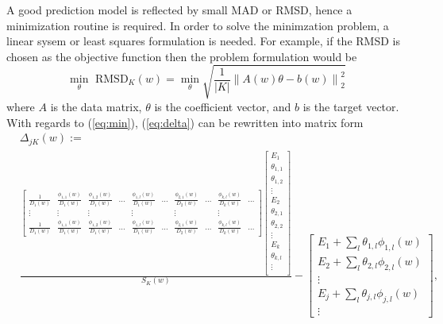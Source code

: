 \documentclass[12pt]{article}
\begin{document}
A good prediction model is reflected by small MAD or RMSD, hence a minimization routine is required. In order to solve the minimzation problem, a linear sysem or least squares formulation is needed. For example, if the RMSD is chosen as the objective function then the problem formulation would be
\begin{equation}
    \label{eq:min}
    \min_{\theta} \text{ RMSD}_K(w) = \min_{\theta} \sqrt{\frac{1}{|K|} \left\| A(w)\theta - b(w)\right\|_2^2}
\end{equation}
where $A$ is the data matrix, $\theta$ is the coefficient vector, and $b$ is the target vector.
With regards to (\ref{eq:min}), (\ref{eq:delta}) can be rewritten into matrix form
\begin{equation}
    \label{eq:delta_matrix}
    \begin{split}
        &\Delta_{jK}(w) := \\
        &\frac{
            \begin{bmatrix}
                \frac{1}{D_1(w)} & \frac{\phi_{1, 1}(w)}{D_1(w)} & \frac{\phi_{1,2}(w)}{D_1(w)} & \dots & \frac{\phi_{1,l}(w)}{D_1(w)} & \dots & \frac{\phi_{2,1}(w)}{D_2(w)} & \dots & \frac{\phi_{k,l}(w)}{D_k(w)} & \dots \\
                \vdots & \vdots & \vdots & & \vdots & & \vdots & & \vdots &\\
                \frac{1}{D_1(w)} & \frac{\phi_{1, 1}(w)}{D_1(w)} & \frac{\phi_{1,2}(w)}{D_1(w)} & \dots & \frac{\phi_{1,l}(w)}{D_1(w)} & \dots & \frac{\phi_{2,1}(w)}{D_2(w)} & \dots & \frac{\phi_{k,l}(w)}{D_k(w)} & \dots
            \end{bmatrix}
            \begin{bmatrix}
                E_1 \\
                \theta_{1,1} \\
                \theta_{1,2} \\
                \vdots \\
                E_2 \\
                \theta_{2,1} \\
                \theta_{2,2} \\
                \vdots \\
                E_k \\
                \theta_{k,l} \\
                \vdots \\
            \end{bmatrix}
        }{S_K(w)}
        -
        \begin{bmatrix}
            E_1 + \sum_l \theta_{1,l} \phi_{1,l}(w) \\
            E_2 + \sum_l \theta_{2,l} \phi_{2,l}(w) \\
            \vdots \\
            E_j + \sum_l \theta_{j,l} \phi_{j,l}(w) \\
            \vdots
        \end{bmatrix}
        ,
    \end{split}
\end{equation}
\end{document}
